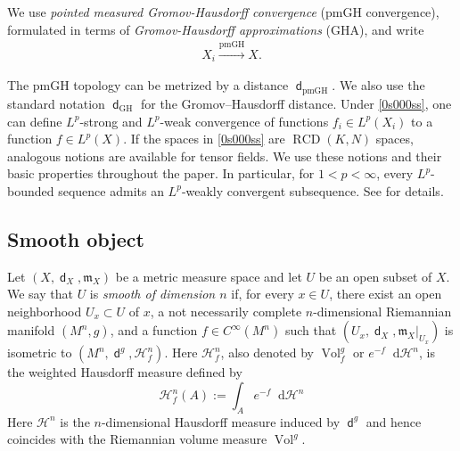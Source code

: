 \documentclass[11pt,reqno]{amsart}
\theoremstyle{definition}
\numberwithin{equation}{section}
\newcommand{\di}{\mathop{}\!\mathrm{d}}
\newcommand{\meas}{\mathfrak{m}}
\DeclareMathOperator{\dist}{\mathsf{d}}
\DeclareMathOperator{\RCD}{RCD}
\DeclareMathOperator{\Vol}{Vol}
\newcommand{\haus}{\mathscr{H}}
\begin{document}
We use {\it pointed measured Gromov-Hausdorff convergence} (pmGH convergence), formulated in terms of {\it Gromov-Hausdorff approximations} (GHA), and write
\begin{align}\label{0s000ss}
        X_i\xrightarrow{\mathrm{pmGH}} X.
    \end{align}
    
    The pmGH topology can be metrized by a distance $\dist_{\mathrm{pmGH}}$.      We also use the standard notation $\dist_{\mathrm{GH}}$ for the Gromov--Hausdorff distance. 
Under \eqref{0s000ss}, one can define $L^p$-strong and $L^p$-weak convergence of functions $f_i\in L^p(X_i)$ to a function $f\in L^p(X)$. If the spaces in \eqref{0s000ss} are $\RCD(K,N)$ spaces, analogous notions are available for tensor fields. We use these notions and their basic properties throughout the paper. In particular, for $1<p<\infty$, every $L^p$-bounded sequence admits an $L^p$-weakly convergent subsequence. See \cite{AmbrosioHonda, Honda2, GMS} for details.

\subsection{Smooth object}\label{prop:equiv: be}
Let $(X, \dist_X, \meas_X)$ be a metric measure space and let $U$ be an open subset of $X$. 
We say that $U$ is \textit{smooth of dimension $n$} if, for every $x\in U$, there exist an open neighborhood $U_x\subset U$ of $x$, a not necessarily complete $n$-dimensional Riemannian manifold $(M^n,g)$, and a function $f\in C^{\infty}(M^n)$ such that $(U_x,\dist_X,\meas_X|_{U_x})$ is isometric to $(M^n,\dist^g,\haus_f^n)$. Here $\haus_f^n$, also denoted by $\Vol_f^g$ or $e^{-f}\di\haus^n$, is the weighted Hausdorff measure defined by
\begin{equation*}
\haus^n_f(A):=\int_Ae^{-f}\di \haus^n
\end{equation*}
Here $\haus^n$ is the $n$-dimensional Hausdorff measure induced by $\dist^g$ and hence coincides with the Riemannian volume measure $\Vol^g$.
\end{document}
